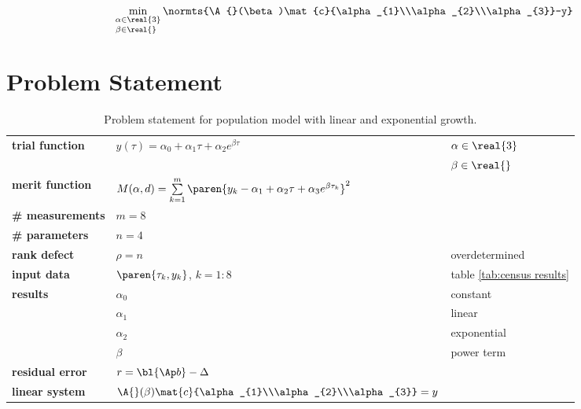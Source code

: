  \begin{equation} %
      \min_{\substack{\alpha\in\real{3}\\\beta\in\real{}\phantom{^{3}}}} \normts{\A{}(\beta)\mat{c}{\alpha_{1}\\\alpha_{2}\\\alpha_{3}}-y}
  \end{equation}
\section{Problem Statement}  %

  \begin{table}[t]  %
    \caption{Problem statement for population model with linear and exponential growth.}
    \begin{center}
      \begin{tabular}{lll}
        \bf{trial function} & $y(\tau) = \alpha_{0} + \alpha_{1} \tau + \alpha_{2} e^{\beta \tau}$ & $\alpha\in\real{3}$ \\
        && $\beta\in\real{}$ \\
        \bf{merit function} & $M(\alpha,d) = \sum\limits_{k=1}^{m}\paren{y_{k} - \alpha_{1} + \alpha_{2} \tau + \alpha_{3} e^{\beta \tau_{k}}}^{2}$ \\
        \bf{\# measurements}& $m = 8$ \\
        \bf{\# parameters}  & $n = 4$ \\
        \bf{rank defect}    & $\rho = n$ & overdetermined \\
        \bf{input data}     & $\paren{\tau_{k}, y_{k}}$, $k=1\colon 8$ & table \ref{tab:census results}\\
        \bf{results}        & $\alpha_{0}$ & constant\\
                            & $\alpha_{1}$ & linear\\
                            & $\alpha_{2}$ & exponential\\
                            & $\beta$      & power term\\
        \bf{residual error} & $r = \bl{\Ap b} - \Delta$ \\
        \bf{linear system}  & $\A{}(\beta)\mat{c}{\alpha_{1}\\\alpha_{2}\\\alpha_{3}} = y$ \\
      \end{tabular}
    \end{center}
  \label{tab:census problem statement}
  \end{table}%


